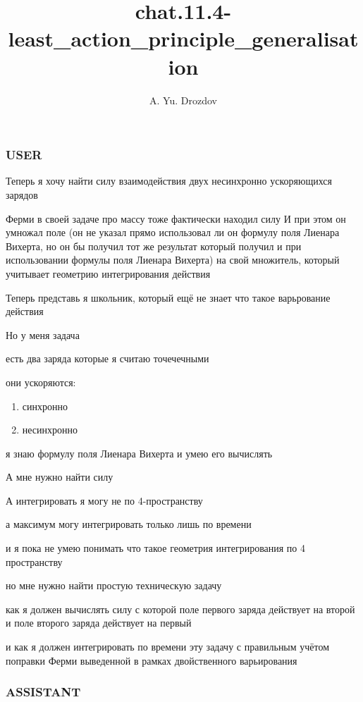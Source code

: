 \documentclass[11pt]{article}
\author{A. Yu. Drozdov}
\title{chat.11.4-least\_action\_principle\_generalisation}
\begin{document}
    \maketitle

    \subsubsection{USER}

Теперь я хочу найти силу взаимодействия двух несинхронно ускоряющихся
зарядов

Ферми в своей задаче про массу тоже фактически находил силу И при этом
он умножал поле (он не указал прямо использовал ли он формулу поля
Лиенара Вихерта, но он бы получил тот же результат который получил и при
использовании формулы поля Лиенара Вихерта) на свой множитель, который
учитывает геометрию интегрирования действия

Теперь представь я школьник, который ещё не знает что такое варьрование
действия

Но у меня задача

есть два заряда которые я считаю точечечными

они ускоряются:

\begin{enumerate}
\def\labelenumi{\arabic{enumi})}
\item
  синхронно
\item
  несинхронно
\end{enumerate}

я знаю формулу поля Лиенара Вихерта и умею его вычислять

А мне нужно найти силу

А интегрировать я могу не по 4-пространству

а максимум могу интегрировать только лишь по времени

и я пока не умею понимать что такое геометрия интегрирования по 4
пространству

но мне нужно найти простую техническую задачу

как я должен вычислять силу с которой поле первого заряда действует на
второй и поле второго заряда действует на первый

и как я должен интегрировать по времени эту задачу с правильным учётом
поправки Ферми выведенной в рамках двойственного варьирования

\subsubsection{ASSISTANT}\label{assistant}
\end{document}
